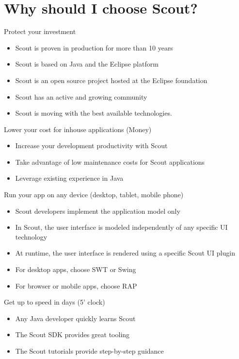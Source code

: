 \documentclass[a4paper,10pt,twoside]{book}
\begin{document}
\section{Why should I choose Scout?}

Protect your investment
\begin{itemize}
  \item Scout is proven in production for more than 10 years
  \item Scout is based on Java and the Eclipse platform
  \item Scout is an open source project hosted at the Eclipse foundation
  \item Scout has an active and growing community
  \item Scout is moving with the best available technologies.

\end{itemize}

Lower your cost for inhouse applications (Money)
\begin{itemize}
  \item Increase your development productivity with Scout
  \item Take advantage of low maintenance costs for Scout applications
  \item Leverage existing experience in Java
\end{itemize}

Run your app on any device (desktop, tablet, mobile phone)
\begin{itemize}
  \item Scout developers implement the application model only
  \item In Scout, the user interface is modeled independently of any specific UI technology
  \item At runtime, the user interface is rendered using a specific Scout UI plugin
  \item For desktop apps, choose SWT or Swing
  \item For browser or mobile apps, choose RAP
\end{itemize}

Get up to speed in days (5' clock)
\begin{itemize}
  \item Any Java developer quickly learns Scout
  \item The Scout SDK provides great tooling
  \item The Scout tutorials provide step-by-step guidance
\end{itemize}
\end{document}
